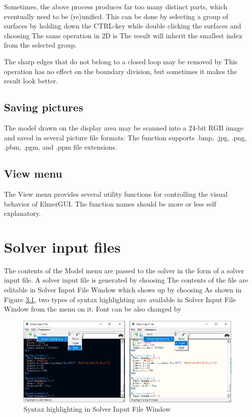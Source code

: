Sometimes, the above process produces far too many distinct parts, which eventually
need to be (re)unified. This can be done by selecting a group of surfaces by holding
down the CTRL-key while double clicking the surfaces and choosing
\noindent The same operation in 2D is
The result will inherit the smallest index from the selected group.

\noindent The sharp edges that do not belong to a closed loop may be removed by
\noindent This operation has no effect on the boundary division, but sometimes it makes
the result look better.

\section{Saving pictures}

The model drawn on the display area may be scanned into a 24-bit RGB image and saved in
several picture file formats:
\noindent The function supports .bmp, .jpg, .png, .pbm, .pgm, and .ppm file extensions.

\section{View menu}

The View menu provides several utility functions for controlling the visual behavior
of ElmerGUI. The function names should be more or less self explanatory.

\chapter{Solver input files}

The contents of the Model menu are passed to the solver in the form of a solver
input file. A solver input file is generated by choosing
\noindent The contents of the file are editable in Solver Input File Window which shows up by choosing
As shown in Figure  \ref{fig:sifwindow}, two types of syntax highlighting are available in Solver Input File Window from the menu on it:
\noindent Font can be also changed by 

\begin{figure}[htb]
	\begin{center}
		\includegraphics[scale=0.5]{images/sifwindow.png}
		\caption{Syntax highlighting in Solver Input File Window}
		\label{fig:sifwindow}
	\end{center}
\end{figure}

